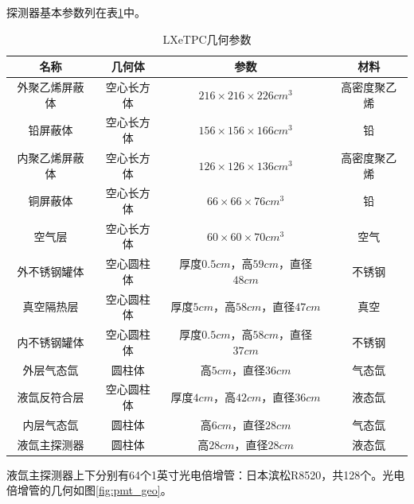 探测器基本参数列在表\ref{tab:relics_material}中。

\begin{table}
  \centering
  \caption{LXeTPC几何参数}
  \begin{tabular}{c|c|c|c}
    \toprule
    名称 & 几何体 & 参数 & 材料 \\
    \midrule
    外聚乙烯屏蔽体 & 空心长方体 & $216\times216\times226\si{cm^3}$ & 高密度聚乙烯 \\
    铅屏蔽体 & 空心长方体 & $156\times156\times166\si{cm^3}$ & 铅 \\
    内聚乙烯屏蔽体 & 空心长方体 & $126\times126\times136\si{cm^3}$ & 高密度聚乙烯 \\
    铜屏蔽体 & 空心长方体 & $66\times66\times76\si{cm^3}$ & 铅 \\
    空气层 & 空心长方体 & $60\times60\times70\si{cm^3}$ & 空气 \\
    外不锈钢罐体 & 空心圆柱体 & 厚度$0.5\si{cm}$，高$59\si{cm}$，直径$48\si{cm}$ & 不锈钢 \\
    真空隔热层 & 空心圆柱体 & 厚度$5\si{cm}$，高$58\si{cm}$，直径$47\si{cm}$ & 真空 \\
    内不锈钢罐体 & 空心圆柱体 & 厚度$0.5\si{cm}$，高$58\si{cm}$，直径$37\si{cm}$ & 不锈钢 \\
    外层气态氙 & 圆柱体 & 高$5\si{cm}$，直径$36\si{cm}$ & 气态氙 \\
    液氙反符合层 & 空心圆柱体 & 厚度$4\si{cm}$，高$42\si{cm}$，直径$36\si{cm}$ & 液态氙 \\
    内层气态氙 & 圆柱体 & 高$6\si{cm}$，直径$28\si{cm}$ & 气态氙 \\
    液氙主探测器 & 圆柱体 & 高$28\si{cm}$，直径$28\si{cm}$ & 液态氙 \\
    \bottomrule
  \end{tabular}
  \label{tab:relics_material}
\end{table}

液氙主探测器上下分别有64个1英寸光电倍增管：日本滨松R8520，共128个。光电倍增管的几何如图\ref{fig:pmt_geo}。

